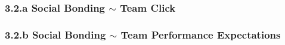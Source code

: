 \subsubsection{3.2.a Social Bonding $\sim$ Team Click}


%

%





\subsubsection{3.2.b Social Bonding $\sim$ Team Performance Expectations}

